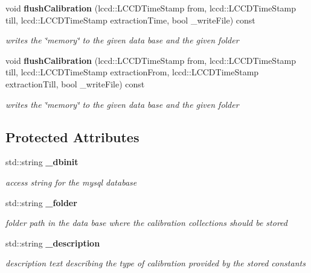 \begin{DoxyCompactItemize}
void {\bf flushCalibration} (lccd::LCCDTimeStamp from, lccd::LCCDTimeStamp till, lccd::LCCDTimeStamp extractionTime, bool \_\-writeFile) const 
\begin{DoxyCompactList}\small\item\em writes the \char`\"{}memory\char`\"{} to the given data base and the given folder \item\end{DoxyCompactList}\item 
void {\bf flushCalibration} (lccd::LCCDTimeStamp from, lccd::LCCDTimeStamp till, lccd::LCCDTimeStamp extractionFrom, lccd::LCCDTimeStamp extractionTill, bool \_\-writeFile) const 
\begin{DoxyCompactList}\small\item\em writes the \char`\"{}memory\char`\"{} to the given data base and the given folder \item\end{DoxyCompactList}\end{DoxyCompactItemize}
\subsection*{Protected Attributes}
\begin{DoxyCompactItemize}
\item 
std::string {\bf \_\-dbinit}\label{classCALICE_1_1CalibrationWriter_adbf1bd238e3c2be0a0d37415374ef407}

\begin{DoxyCompactList}\small\item\em access string for the mysql database \item\end{DoxyCompactList}\item 
std::string {\bf \_\-folder}\label{classCALICE_1_1CalibrationWriter_afdcbcda9534dc8b34ef8f326c540cf2d}

\begin{DoxyCompactList}\small\item\em folder path in the data base where the calibration collections should be stored \item\end{DoxyCompactList}\item 
std::string {\bf \_\-description}\label{classCALICE_1_1CalibrationWriter_a16bade2368e36f698a37bcf65e8b6be9}

\begin{DoxyCompactList}\small\item\em description text describing the type of calibration provided by the stored constants \item\end{DoxyCompactList}\end{DoxyCompactItemize}
